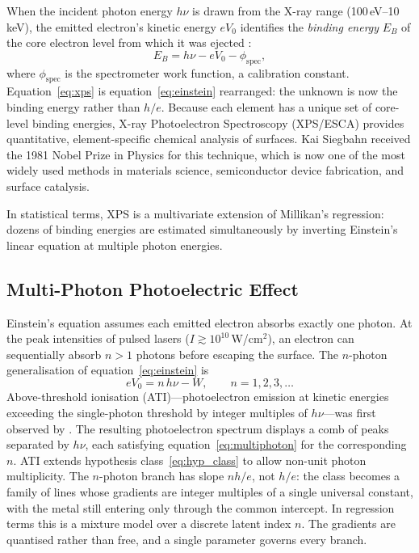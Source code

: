 \documentclass[12pt]{article}
\begin{document}
When the incident photon energy $h\nu$ is drawn from the X-ray range
(100\,eV--10\,keV), the emitted electron's kinetic energy $eV_0$
identifies the \emph{binding energy} $E_B$ of the core electron level
from which it was ejected \citep{Siegbahn1967}:
\begin{equation}\label{eq:xps}
  E_B = h\nu - eV_0 - \phi_{\mathrm{spec}},
\end{equation}
where $\phi_{\mathrm{spec}}$ is the spectrometer work function, a
calibration constant.  Equation~\eqref{eq:xps} is
equation~\eqref{eq:einstein} rearranged: the unknown is now the binding
energy rather than $h/e$.  Because each element has a unique set of
core-level binding energies, X-ray Photoelectron Spectroscopy (XPS/ESCA)
provides quantitative, element-specific chemical analysis of surfaces.
Kai Siegbahn received the 1981 Nobel Prize in Physics for this technique,
which is now one of the most widely used methods in materials science,
semiconductor device fabrication, and surface catalysis.

In statistical terms, XPS is a multivariate extension of Millikan's
regression: dozens of binding energies are estimated simultaneously by
inverting Einstein's linear equation at multiple photon energies.

\subsection{Multi-Photon Photoelectric Effect}
\label{app:multiphoton}

Einstein's equation assumes each emitted electron absorbs exactly one
photon.  At the peak intensities of pulsed lasers
($I \gtrsim 10^{10}$\,W/cm$^2$), an electron can sequentially absorb
$n > 1$ photons before escaping the surface.  The $n$-photon
generalisation of equation~\eqref{eq:einstein} is
\begin{equation}\label{eq:multiphoton}
  eV_0 = n\,h\nu - W, \qquad n = 1, 2, 3, \ldots
\end{equation}
Above-threshold ionisation (ATI)---photoelectron emission at kinetic
energies exceeding the single-photon threshold by integer multiples of
$h\nu$---was first observed by \citet{Agostini1979}.  The resulting
photoelectron spectrum displays a comb of peaks separated by $h\nu$,
each satisfying equation~\eqref{eq:multiphoton} for the corresponding
$n$.  ATI extends hypothesis class~\eqref{eq:hyp_class} to allow non-unit photon
multiplicity.  The $n$-photon branch has slope $nh/e$, not $h/e$: the class
becomes a family of lines whose gradients are integer multiples of a single
universal constant, with the metal still entering only through the common
intercept.  In regression terms this is a mixture model over a discrete latent
index $n$.  The gradients are quantised rather than free, and a single
parameter governs every branch.
\end{document}

